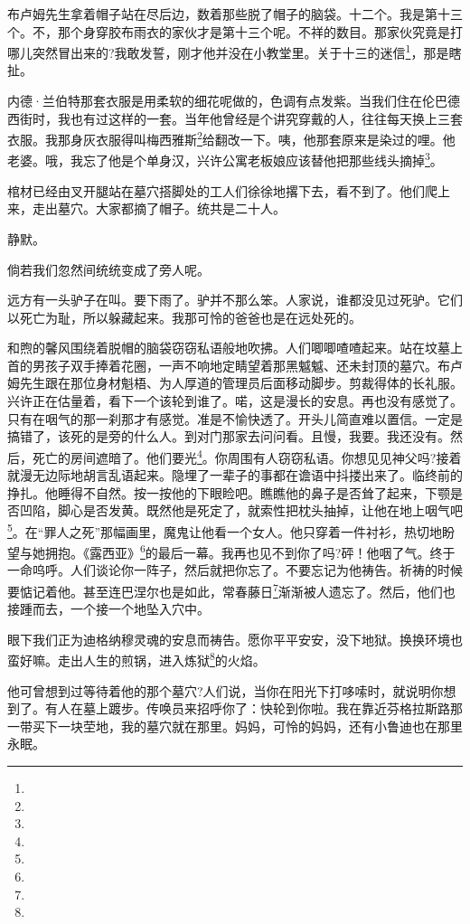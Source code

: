 \par 布卢姆先生拿着帽子站在尽后边，数着那些脱了帽子的脑袋。十二个。我是第十三个。不，那个身穿胶布雨衣的家伙才是第十三个呢。不祥的数目。那家伙究竟是打哪儿突然冒出来的?我敢发誓，刚才他并没在小教堂里。关于十三的迷信\footnote{}，那是瞎扯。
\par 内德·兰伯特那套衣服是用柔软的细花呢做的，色调有点发紫。当我们住在伦巴德西街时，我也有过这样的一套。当年他曾经是个讲究穿戴的人，往往每天换上三套衣服。我那身灰衣服得叫梅西雅斯\footnote{}给翻改一下。咦，他那套原来是染过的哩。他老婆。哦，我忘了他是个单身汉，兴许公寓老板娘应该替他把那些线头摘掉\footnote{}。
\par 棺材已经由叉开腿站在墓穴搭脚处的工人们徐徐地撂下去，看不到了。他们爬上来，走出墓穴。大家都摘了帽子。统共是二十人。
\par 静默。
\par 倘若我们忽然间统统变成了旁人呢。
\par 远方有一头驴子在叫。要下雨了。驴并不那么笨。人家说，谁都没见过死驴。它们以死亡为耻，所以躲藏起来。我那可怜的爸爸也是在远处死的。
\par 和煦的馨风围绕着脱帽的脑袋窃窃私语般地吹拂。人们唧唧喳喳起来。站在坟墓上首的男孩子双手捧着花圈，一声不响地定睛望着那黑魆魆、还未封顶的墓穴。布卢姆先生跟在那位身材魁梧、为人厚道的管理员后面移动脚步。剪裁得体的长礼服。兴许正在估量着，看下一个该轮到谁了。喏，这是漫长的安息。再也没有感觉了。只有在咽气的那一刹那才有感觉。准是不愉快透了。开头儿简直难以置信。一定是搞错了，该死的是旁的什么人。到对门那家去问问看。且慢，我要。我还没有。然后，死亡的房间遮暗了。他们要光\footnote{}。你周围有人窃窃私语。你想见见神父吗?接着就漫无边际地胡言乱语起来。隐埋了一辈子的事都在谵语中抖搂出来了。临终前的挣扎。他睡得不自然。按一按他的下眼睑吧。瞧瞧他的鼻子是否耸了起来，下颚是否凹陷，脚心是否发黄。既然他是死定了，就索性把枕头抽掉，让他在地上咽气吧\footnote{}。在“罪人之死”那幅画里，魔鬼让他看一个女人。他只穿着一件衬衫，热切地盼望与她拥抱。《露西亚》\footnote{}的最后一幕。我再也见不到你了吗?砰！他咽了气。终于一命呜呼。人们谈论你一阵子，然后就把你忘了。不要忘记为他祷告。祈祷的时候要惦记着他。甚至连巴涅尔也是如此，常春藤日\footnote{}渐渐被人遗忘了。然后，他们也接踵而去，一个接一个地坠入穴中。
\par 眼下我们正为迪格纳穆灵魂的安息而祷告。愿你平平安安，没下地狱。换换环境也蛮好嘛。走出人生的煎锅，进入炼狱\footnote{}的火焰。
\par 他可曾想到过等待着他的那个墓穴?人们说，当你在阳光下打哆嗦时，就说明你想到了。有人在墓上踱步。传唤员来招呼你了：快轮到你啦。我在靠近芬格拉斯路那一带买下一块茔地，我的墓穴就在那里。妈妈，可怜的妈妈，还有小鲁迪也在那里永眠。
